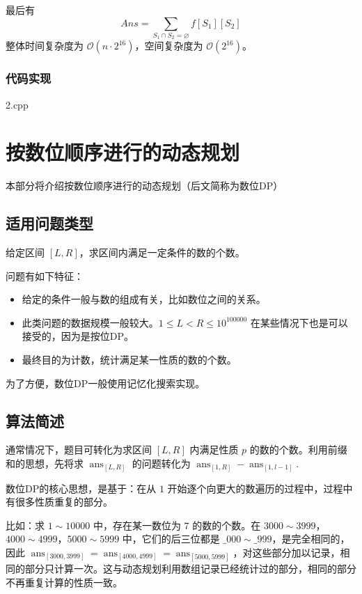 最后有 \[
Ans=\sum_{S_1\cap S_2=\varnothing}f[S_1][S_2]
\] 整体时间复杂度为 \(\mathcal{O}(n\cdot 2^{16})\)，空间复杂度为
\(\mathcal{O}(2^{16})\)。

\subsubsection{代码实现}

2.cpp

\section{按数位顺序进行的动态规划}

本部分将介绍按数位顺序进行的动态规划（后文简称为数位DP）

\subsection{适用问题类型}

给定区间 \([L,R]\)，求区间内满足一定条件的数的个数。

问题有如下特征：

\begin{itemize}
\item
  给定的条件一般与数的组成有关，比如数位之间的关系。
\item
  此类问题的数据规模一般较大。\(1\leq L<R\leq 10^{100000}\)
  在某些情况下也是可以接受的，因为是按位DP。
\item
  最终目的为计数，统计满足某一性质的数的个数。
\end{itemize}

为了方便，数位DP一般使用记忆化搜索实现。

\subsection{算法简述}

通常情况下，题目可转化为求区间 \([L, R]\) 内满足性质 \(p\)
的数的个数。利用前缀和的思想，先将求 \(\operatorname{ans}_{[L,R]}\)
的问题转化为
\(\operatorname{ans}_{[1,R]}-\operatorname{ans}_{[1,l-1]}\).

数位DP的核心思想，是基于：在从 \(1\)
开始逐个向更大的数遍历的过程中，过程中有很多性质重复的部分。

比如：求 \(1\sim 10000\) 中，存在某一数位为 \(7\) 的数的个数。在
\(3000\sim3999\)，\(4000\sim4999\)，\(5000\sim 5999\)
中，它们的后三位都是 \(\_000\sim \_ 999\)，是完全相同的，因此
\(\operatorname{ans}_{[3000,3999]}=\operatorname{ans}_{[4000,4999]}=\operatorname{ans}_{[5000,5999]}\)，对这些部分加以记录，相同的部分只计算一次。这与动态规划利用数组记录已经统计过的部分，相同的部分不再重复计算的性质一致。

